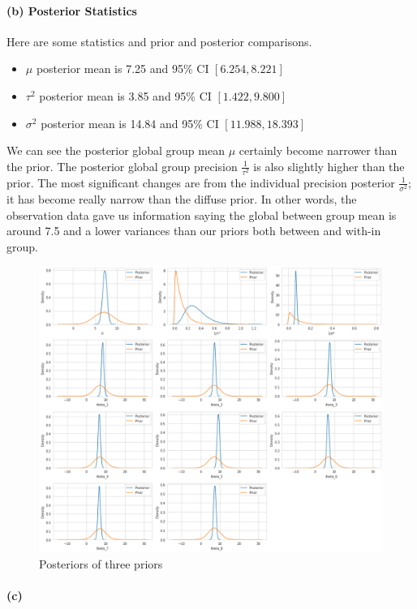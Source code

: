 \documentclass[11pt, letterpaper]{article}
\begin{document}
\paragraph{(b) Posterior Statistics}
Here are some statistics and prior and posterior comparisons.
\begin{itemize}
    \item $\mu$ posterior mean is 7.25 and 95\% CI $[6.254, 8.221]$
    \item $\tau^2$ posterior mean is 3.85 and 95\% CI $[1.422, 9.800]$
    \item $\sigma^2$ posterior mean is 14.84 and 95\% CI $[11.988, 18.393]$
\end{itemize}
We can see the posterior global group mean $\mu$ certainly become narrower than the prior. The posterior global group precision $\frac{1}{\tau^2}$ is also slightly higher than the prior. The most significant changes are from the individual precision posterior $\frac{1}{\sigma^2}$; it has become really narrow than the diffuse prior. In other words, the observation data gave us information saying the global between group mean is around 7.5 and a lower variances than our priors both between and with-in group.
\begin{figure}[!h]
  \centering
  \includegraphics[width=1.0\textwidth]{3.b.png}
  \captionsetup{justification=centering}
  \caption{Posteriors of three priors}
\end{figure}

\paragraph{(c)}
\end{document}
